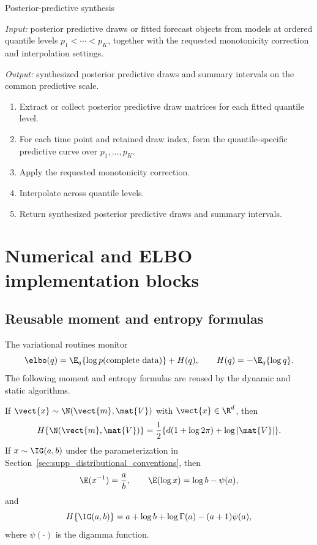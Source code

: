 \begin{suppalgorithm}{Posterior-predictive synthesis}
\label{alg:predictive-synthesis}
\par\noindent\emph{Input:} posterior predictive draws or fitted forecast
objects from models at ordered quantile levels $p_1<\cdots<p_K$, together with
the requested monotonicity correction and interpolation settings.
\par\noindent\emph{Output:} synthesized posterior predictive draws and
summary intervals on the common predictive scale.
\begin{enumerate}[label=(\arabic*)]
\item Extract or collect posterior predictive draw matrices for each fitted
quantile level.
\item For each time point and retained draw index, form the quantile-specific
predictive curve over $p_1,\ldots,p_K$.
\item Apply the requested monotonicity correction.
\item Interpolate across quantile levels.
\item Return synthesized posterior predictive draws and summary intervals.
\end{enumerate}
\end{suppalgorithm}

\section{Numerical and ELBO implementation blocks}
\label{sec:numerical_blocks}

\subsection{Reusable moment and entropy formulas}
\label{sec:elbo_building_blocks}

The variational routines monitor
\begin{equation}
\elbo(q)=\E_q\{\log p(\text{complete data})\}+H(q),
\qquad
H(q)=-\E_q\{\log q\}.
\end{equation}
The following moment and entropy formulas are reused by the dynamic and static
algorithms.

If $\vect{x}\sim\N(\vect{m},\mat{V})$ with
$\vect{x}\in\R^d$, then
\begin{equation}
H\{\N(\vect{m},\mat{V})\}
=\frac{1}{2}\{d(1+\log 2\pi)+\log|\mat{V}|\}.
\label{eq:entropy_gaussian}
\end{equation}
If $x\sim\IG(a,b)$ under the parameterization in
Section~\ref{sec:supp_distributional_conventions}, then
\begin{equation}
\E(x^{-1})=\frac{a}{b},\qquad
\E(\log x)=\log b-\psi(a),
\end{equation}
and
\begin{equation}
H\{\IG(a,b)\}
=a+\log b+\log\Gamma(a)-(a+1)\psi(a),
\label{eq:entropy_ig}
\end{equation}
where $\psi(\cdot)$ is the digamma function.

